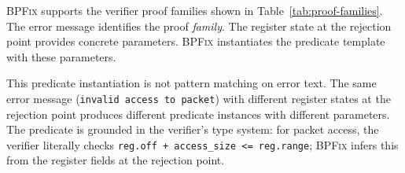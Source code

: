 \documentclass[sigplan,10pt,anonymous,review]{acmart}
\newcommand{\sys}{\textsc{BPFix}\xspace}
\begin{document}
\sys supports the verifier proof families shown in
Table~\ref{tab:proof-families}.
The error message identifies the proof \emph{family}.  The register state
at the rejection point provides concrete parameters.  \sys instantiates the
predicate template with these parameters.

\begin{table}[t]
  \centering
  \footnotesize
  \caption{Verifier proof families reconstructed by \sys.}
  \label{tab:proof-families}
\end{table}

This predicate instantiation is not pattern matching on error text.  The same
error message (\texttt{invalid access to packet}) with different register
states at the rejection point produces different predicate instances with
different parameters.  The predicate is grounded in the verifier's type system:
for packet access, the verifier literally checks
\texttt{reg.off~+~access\_size~<=~reg.range}; \sys infers this from the
register fields at the rejection point.
\end{document}
